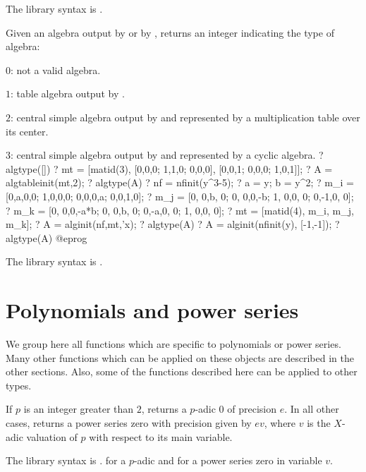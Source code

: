 The library syntax is .

\label{se:algtype}
Given an algebra  output by  or by , returns an integer indicating the type of algebra:

\item $0$: not a valid algebra.

\item $1$: table algebra output by .

\item $2$: central simple algebra output by  and represented by
a multiplication table over its center.

\item $3$: central simple algebra output by  and represented by
a cyclic algebra.
\bprog
? algtype([])
? mt = [matid(3), [0,0,0; 1,1,0; 0,0,0], [0,0,1; 0,0,0; 1,0,1]];
? A = algtableinit(mt,2);
? algtype(A)
? nf = nfinit(y^3-5);
?  a = y; b = y^2;
?  {m_i = [0,a,0,0;
           1,0,0,0;
           0,0,0,a;
           0,0,1,0];}
?  {m_j = [0, 0,b, 0;
           0, 0,0,-b;
           1, 0,0, 0;
           0,-1,0, 0];}
?  {m_k = [0, 0,0,-a*b;
           0, 0,b,   0;
           0,-a,0,   0;
           1, 0,0,   0];}
?  mt = [matid(4), m_i, m_j, m_k];
?  A = alginit(nf,mt,'x);
? algtype(A)
? A = alginit(nfinit(y), [-1,-1]);
? algtype(A)
@eprog

The library syntax is .

\section{Polynomials and power series}

We group here all functions which are specific to polynomials or power
series. Many other functions which can be applied on these objects are
described in the other sections. Also, some of the functions described here
can be applied to other types.


\label{se:O}
If $p$ is an integer
greater than $2$, returns a $p$-adic $0$ of precision $e$. In all other
cases, returns a power series zero with precision given by $e v$, where $v$
is the $X$-adic valuation of $p$ with respect to its main variable.

The library syntax is .
 for a $p$-adic and
 for a power series zero in variable $v$.

